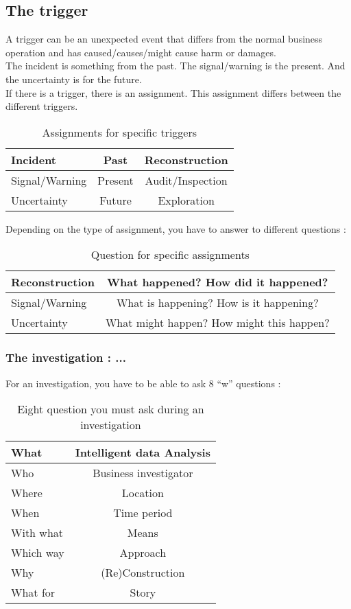 \subsection{The trigger}
A trigger can be an unexpected event that differs from the normal business operation and has caused/causes/might cause harm or damages.\\
The incident is something from the past. The signal/warning is the present. And the uncertainty is for the future.\\
If there is a trigger, there is an assignment. This assignment differs between the different triggers.
\begin{table}[H]
 \centering
 \begin{tabular}{|l|c|c|}
 \hline
  Incident & Past & Reconstruction\\\hline
  Signal/Warning & Present & Audit/Inspection\\\hline
  Uncertainty & Future & Exploration\\\hline
 \end{tabular}
 \caption{Assignments for specific triggers}
\end{table}
Depending on the type of assignment, you have to answer to different questions :
\begin{table}[H]
 \centering
 \begin{tabular}{|l|c|}
 \hline
  Reconstruction & What happened? How did it happened?\\\hline
  Signal/Warning & What is happening? How is it happening?\\\hline
  Uncertainty & What might happen? How might this happen?\\\hline
 \end{tabular}
 \caption{Question for specific assignments}
\end{table}
\subsubsection{The investigation : ...}
For an investigation, you have to be able to ask 8 \enquote{w} questions :
\begin{table}[H]
 \centering
 \begin{tabular}{|l|c|}
 \hline
  What & Intelligent data Analysis\\\hline
  Who & Business investigator\\\hline
  Where & Location\\\hline
  When & Time period\\\hline
  With what & Means\\\hline
  Which way & Approach\\\hline
  Why & (Re)Construction\\\hline
  What for & Story\\\hline
 \end{tabular}
 \caption{Eight question you must ask during an investigation}
\end{table}
